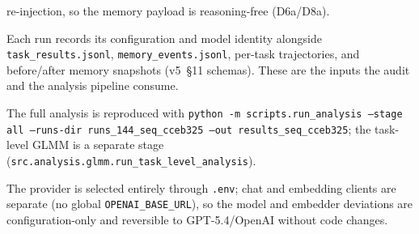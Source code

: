 \begin{description}
    re-injection, so the memory payload is reasoning-free (D6a/D8a).
  \item[Per-run logging.] Each run records its configuration and model identity alongside
    \texttt{task\_results.jsonl}, \texttt{memory\_events.jsonl}, per-task trajectories, and
    before/after memory snapshots (v5~\S11 schemas). These are the inputs the audit and the
    analysis pipeline consume.
  \item[Re-derivation.] The full analysis is reproduced with
    \texttt{python -m scripts.run\_analysis --stage all --runs-dir runs\_144\_seq\_cceb325
    --out results\_seq\_cceb325}; the task-level GLMM is a separate stage
    (\texttt{src.analysis.glmm.run\_task\_level\_analysis}).
  \item[Reversibility.] The provider is selected entirely through \texttt{.env}; chat and
    embedding clients are separate (no global \texttt{OPENAI\_BASE\_URL}), so the model and
    embedder deviations are configuration-only and reversible to GPT-5.4/OpenAI without code
    changes.
\end{description}
